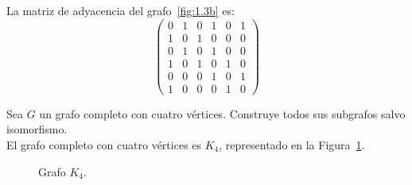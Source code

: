 \begin{ejercicio}
    La matriz de adyacencia del grafo~\ref{fig:1.3b} es:
    \begin{equation*}
        \begin{pmatrix}
            0 & 1 & 0 & 1 & 0 & 1 \\
            1 & 0 & 1 & 0 & 0 & 0 \\
            0 & 1 & 0 & 1 & 0 & 0 \\
            1 & 0 & 1 & 0 & 1 & 0 \\
            0 & 0 & 0 & 1 & 0 & 1 \\
            1 & 0 & 0 & 0 & 1 & 0
        \end{pmatrix}
    \end{equation*}
\end{ejercicio}

\begin{ejercicio}\label{ej:1.4}
    Sea $G$ un grafo completo con cuatro vértices. Construye todos sus subgrafos salvo isomorfismo.\\

    El grafo completo con cuatro vértices es $K_4$, representado en la Figura~\ref{fig:1.4_1}.
    \begin{figure}
        \centering
        \caption{Grafo $K_4$.}
        \label{fig:1.4_1}
    \end{figure}
\end{ejercicio}


